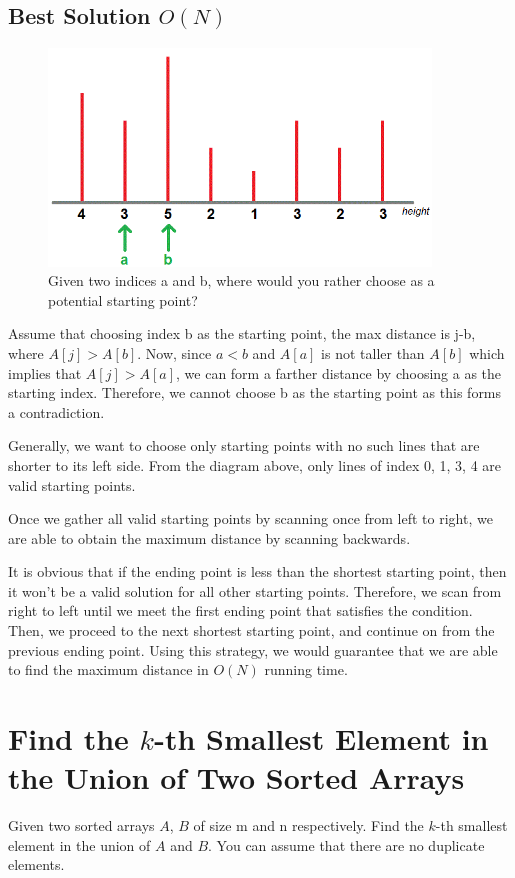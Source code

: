 \documentclass[12pt, reqno, oneside]{amsart}
\begin{document}
\subsection{Best Solution $O(N)$}

\begin{figure}[htbp] %
   \centering
   \includegraphics[width=4in]{figs/A_Distance_Maximizing_Problem.png} 
   \caption{Given two indices a and b, where would you rather choose as a potential starting point?}
   \label{fig:dist_max}
\end{figure}

Assume that choosing index b as the starting point, the max distance is j-b, where $A[j] > A[b]$. Now, since $a < b$ and $A[a]$ is not taller than $A[b]$ which implies that $A[j] > A[a]$, we can form a farther distance by choosing a as the starting index. Therefore, we cannot choose b as the starting point as this forms a contradiction.

Generally, we want to choose only starting points with no such lines that are shorter to its left side. From the diagram above, only lines of index 0, 1, 3, 4 are valid starting points.

Once we gather all valid starting points by scanning once from left to right, we are able to obtain the maximum distance by scanning backwards.

It is obvious that if the ending point is less than the shortest starting point, then it won’t be a valid solution for all other starting points. Therefore, we scan from right to left until we meet the first ending point that satisfies the condition. Then, we proceed to the next shortest starting point, and continue on from the previous ending point. Using this strategy, we would guarantee that we are able to find the maximum distance in $O(N)$ running time.

\section{Find the $k$-th Smallest Element in the Union of Two Sorted Arrays}
Given two sorted arrays $A$, $B$ of size m and n respectively. Find the $k$-th smallest element in the union of $A$ and $B$. You can assume that there are no duplicate elements.
\end{document}
